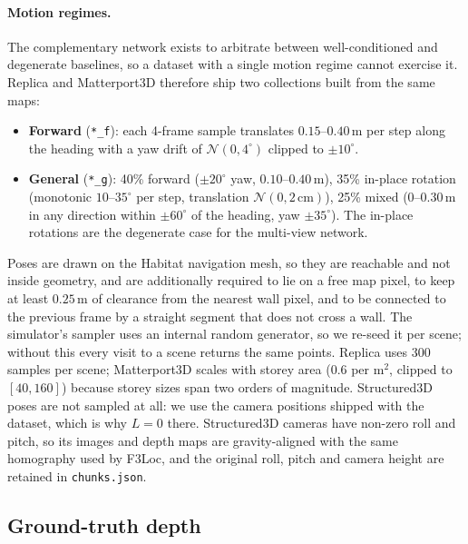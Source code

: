 \paragraph{Motion regimes.}
The complementary network exists to arbitrate between well-conditioned and
degenerate baselines, so a dataset with a single motion regime cannot exercise it.
Replica and Matterport3D therefore ship two collections built from the same maps:

\begin{itemize}
  \item \textbf{Forward} (\texttt{*\_f}): each 4-frame sample translates
        $0.15$--$0.40\,\mathrm{m}$ per step along the heading with a yaw drift of
        $\mathcal{N}(0, 4^\circ)$ clipped to $\pm 10^\circ$.
  \item \textbf{General} (\texttt{*\_g}): 40\% forward ($\pm 20^\circ$ yaw,
        $0.10$--$0.40\,\mathrm{m}$), 35\% in-place rotation (monotonic
        $10$--$35^\circ$ per step, translation $\mathcal{N}(0, 2\,\mathrm{cm})$),
        25\% mixed ($0$--$0.30\,\mathrm{m}$ in any direction within $\pm 60^\circ$
        of the heading, yaw $\pm 35^\circ$). The in-place rotations are the
        degenerate case for the multi-view network.
\end{itemize}

Poses are drawn on the Habitat navigation mesh, so they are reachable and not
inside geometry, and are additionally required to lie on a free map pixel, to keep
at least $0.25\,\mathrm{m}$ of clearance from the nearest wall pixel, and to be
connected to the previous frame by a straight segment that does not cross a wall.
The simulator's sampler uses an internal random generator, so we re-seed it per
scene; without this every visit to a scene returns the same points. Replica uses
300 samples per scene; Matterport3D scales with storey area (0.6 per
$\mathrm{m}^2$, clipped to $[40, 160]$) because storey sizes span two orders of
magnitude. Structured3D poses are not sampled at all: we use the camera positions
shipped with the dataset, which is why $L = 0$ there. Structured3D cameras have
non-zero roll and pitch, so its images and depth maps are gravity-aligned with the
same homography used by F3Loc, and the original roll, pitch and camera height are
retained in \texttt{chunks.json}.

\subsection{Ground-truth depth}
\label{sec:supp-depth}

